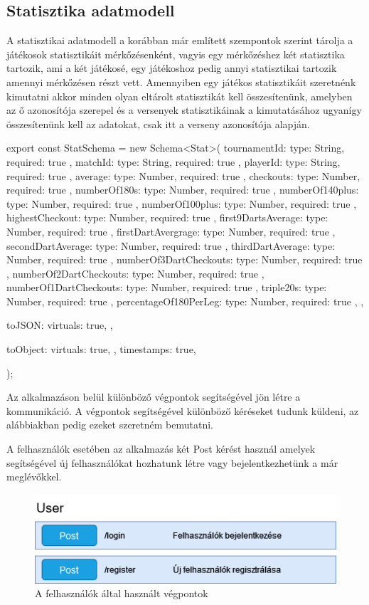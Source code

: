 \subsection{Statisztika adatmodell}
A statisztikai adatmodell a korábban már említett szempontok szerint tárolja a játékosok statisztikáit mérkőzésenként, vagyis egy mérkőzéshez két statisztika tartozik, ami a két játékosé, egy játékoshoz pedig annyi statisztikai tartozik amennyi mérkőzésen részt vett. Amennyiben egy játékos statisztikáit szeretnénk kimutatni akkor minden olyan eltárolt statisztikát kell összesítenünk, amelyben az ő azonosítója szerepel és a versenyek statisztikáinak a kimutatásához ugyanígy összesítenünk kell az adatokat, csak itt a verseny azonosítója alapján.

\begin{cpp}
export const StatSchema = new Schema<Stat>(
  {
    tournamentId: { type: String, required: true },
    matchId: { type: String, required: true },
    playerId: { type: String, required: true },
    average: { type: Number, required: true },
    checkouts: { type: Number, required: true },
    numberOf180s: { type: Number, required: true },
    numberOf140plus: { type: Number, required: true },
    numberOf100plus: { type: Number, required: true },
    highestCheckout: { type: Number, required: true },
    first9DartsAverage: { type: Number, required: true },
    firstDartAvergrage: { type: Number, required: true },
    secondDartAverage: { type: Number, required: true },
    thirdDartAverage: { type: Number, required: true },
    numberOf3DartCheckouts: { type: Number, required: true },
    numberOf2DartCheckouts: { type: Number, required: true },
    numberOf1DartCheckouts: { type: Number, required: true },
    triple20s: { type: Number, required: true },
    percentageOf180PerLeg: { type: Number, required: true },
  },
  {
    toJSON: {
      virtuals: true,
    },

    toObject: {
      virtuals: true,
    },
    timestamps: true,
  }
);
\end{cpp}

Az alkalmazáson belül különböző végpontok segítségével jön létre a kommunikáció. A végpontok segítségével különböző kéréseket tudunk küldeni, az alábbiakban pedig ezeket szeretném bemutatni.

A felhasználók esetében az alkalmazás két Post kérést használ amelyek segítségével új felhasználókat hozhatunk létre vagy bejelentkezhetünk a már meglévőkkel.

\begin{figure}[h]
\centering
\includegraphics[scale=0.3]{images/User_Vegpontok.drawio.png}
\caption{A felhasználók által használt végpontok}
\label{fig:cimer}
\end{figure}

